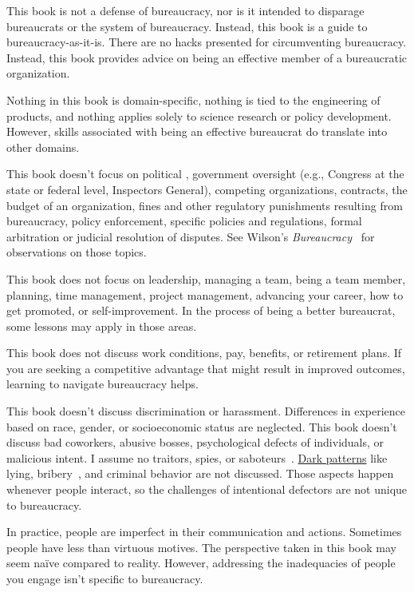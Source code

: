 This book is not a defense of bureaucracy, nor is it intended to disparage bureaucrats or the system of bureaucracy. Instead, this book is a guide to bureaucracy-as-it-is. There are no hacks presented for circumventing bureaucracy. Instead, this book provides advice on being an effective member of a bureaucratic organization.

Nothing in this book is domain-specific, nothing is tied to the engineering of products, and nothing applies solely to science research or policy development. However, skills associated with being an effective bureaucrat do translate into other domains.

This book doesn't focus on political 
\iftoggle{glossarysubstitutionworks}{\glspl{policymaker}}{policymakers}, government oversight (e.g., Congress at the state or federal level, Inspectors General), 
competing organizations, contracts, the budget of an organization, fines and other regulatory punishments resulting from bureaucracy, policy enforcement, specific policies and regulations, formal arbitration or judicial resolution of disputes. See Wilson's \textit{Bureaucracy}~\cite{1991_Wilson} for observations on those topics. 


This book does not focus on leadership, managing a team, being a team member, planning, time management, project management, advancing your career, how to get promoted, or self-improvement. In the process of being a better bureaucrat, some lessons may apply in those areas.


This book does not discuss work conditions, pay, benefits, or retirement plans. If you are seeking a competitive advantage that might result in improved outcomes, learning to navigate bureaucracy helps.


This book doesn't discuss discrimination or harassment. Differences in experience based on race, gender, or socioeconomic status are neglected. This book doesn't discuss bad coworkers, abusive bosses, psychological defects of individuals, or malicious intent. I assume no traitors, spies, 
or saboteurs~\cite{1944_War_Dept}. \href{https://en.wikipedia.org/wiki/Dark_pattern}{Dark patterns} 
like lying, bribery~\cite{2021_Ang}, and criminal behavior are not discussed. Those aspects happen whenever people interact, so  the challenges of intentional defectors are not unique to bureaucracy. 

In practice, people are imperfect in their communication and actions. Sometimes people have less than virtuous motives. The perspective taken in this book may seem na\"ive compared to reality. 
However, addressing the inadequacies of people you engage isn't specific to bureaucracy.


